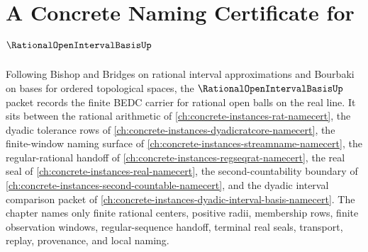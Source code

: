 \chapter{A Concrete Naming Certificate for $\RationalOpenIntervalBasisUp$}
\label{ch:concrete-instances-rational-open-interval-basis-namecert}

Following Bishop and Bridges on rational interval approximations and Bourbaki on bases for ordered topological spaces, the $\RationalOpenIntervalBasisUp$ packet records the finite BEDC carrier for rational open balls on the real line. It sits between the rational arithmetic of \autoref{ch:concrete-instances-rat-namecert}, the dyadic tolerance rows of \autoref{ch:concrete-instances-dyadicratcore-namecert}, the finite-window naming surface of \autoref{ch:concrete-instances-streamname-namecert}, the regular-rational handoff of \autoref{ch:concrete-instances-regseqrat-namecert}, the real seal of \autoref{ch:concrete-instances-real-namecert}, the second-countability boundary of \autoref{ch:concrete-instances-second-countable-namecert}, and the dyadic interval comparison packet of \autoref{ch:concrete-instances-dyadic-interval-basis-namecert}. The chapter names only finite rational centers, positive radii, membership rows, finite observation windows, regular-sequence handoff, terminal real seals, transport, replay, provenance, and local naming.

